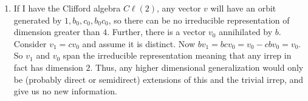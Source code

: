 \documentclass[11pt, class=article, crop=false]{standalone}
\begin{document}
\begin{enumerate}
	  
	  \item If I have the Clifford algebra $C\ell(2)$, any vector $v$ will have an orbit generated by $1, b_0, c_0, b_0 c_0$, so there can be no irreducible representation of dimension greater than $4$. Further, there is a vector $v_0$ annihilated by $b$. Consider $v_1 = c v_0$ and assume it is distinct. Now $b v_1 = b c v_0 = v_0 - c b v_0 = v_0$. So $v_1$ and $v_0$ span the irreducible representation meaning that any irrep in fact has dimension $2$. Thus, any higher dimensional generalization would only be (probably direct or semidirect) extensions of this and the trivial irrep, and give us no new information. 
	  
	\end{enumerate}
	
\end{document}
